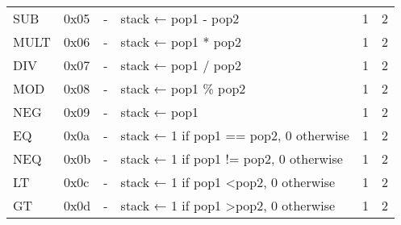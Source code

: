 \begin{longtable}[c]{L{2.5cm} L{1cm} L{3cm} L{5.5cm} R{0.8cm} R{1cm} }
SUB       & 0x05   & -                                                                                                        & stack ← pop1 - pop2                                                                                         & 1         & 2          \\
MULT      & 0x06   & -                                                                                                        & stack ← pop1 * pop2                                                                                         & 1         & 2          \\
DIV       & 0x07   & -                                                                                                        & stack ← pop1 / pop2                                                                                         & 1         & 2          \\
MOD       & 0x08   & -                                                                                                        & stack ← pop1 \% pop2                                                                                        & 1         & 2          \\
NEG       & 0x09   & -                                                                                                        & stack ← \-pop1                                                                                                & 1         & 2          \\
EQ        & 0x0a   & -                                                                                                        & stack ← 1 if pop1 == pop2, 0 otherwise                                                                      & 1         & 2          \\
NEQ       & 0x0b   & -                                                                                                        & stack ← 1 if pop1 != pop2, 0 otherwise                                                                      & 1         & 2          \\
LT        & 0x0c   & -                                                                                                        & stack ← 1 if pop1 \textless pop2, 0 otherwise                                                               & 1         & 2          \\
GT        & 0x0d   & -                                                                                                        & stack ← 1 if pop1 \textgreater pop2, 0 otherwise                                                            & 1         & 2          \\

\end{longtable}
